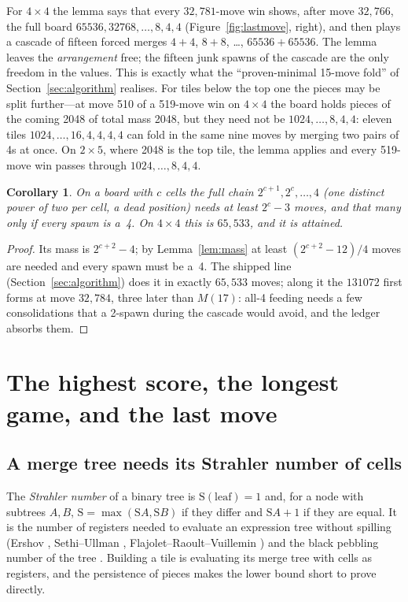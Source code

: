 \documentclass[11pt]{article}
\newtheorem{corollary}[theorem]{Corollary}
\theoremstyle{definition}
\theoremstyle{remark}
\newcommand{\Str}{\mathrm{S}}
\begin{document}
For $4\times4$ the lemma says that every $32{,}781$-move win shows, after
move $32{,}766$, the full board $65536,32768,\dots,8,4,4$
(Figure~\ref{fig:lastmove}, right), and then plays a cascade of fifteen
forced merges $4+4$, $8+8$, \dots, $65536+65536$. The lemma leaves the
\emph{arrangement} free; the fifteen junk spawns of the cascade are the
only freedom in the values. This is exactly what the ``proven-minimal
15-move fold'' of Section~\ref{sec:algorithm} realises. For tiles below
the top one the pieces may be split further---at move 510 of a 519-move
win on $4\times4$ the board holds pieces of the coming 2048 of total mass
2048, but they need not be $1024,\dots,8,4,4$: eleven tiles
$1024,\dots,16,4,4,4,4$ can fold in the same nine moves by merging two
pairs of 4s at once. On $2\times5$, where 2048 is the top tile, the lemma
applies and every 519-move win passes through $1024,\dots,8,4,4$.

\begin{corollary}\label{cor:chain}
On a board with $c$ cells the \emph{full chain} $2^{c+1},2^{c},\dots,4$
(one distinct power of two per cell, a dead position) needs at least
$2^{c}-3$ moves, and that many only if every spawn is a~4. On $4\times4$
this is $65{,}533$, and it is attained.
\end{corollary}
\begin{proof}
Its mass is $2^{c+2}-4$; by Lemma~\ref{lem:mass} at least $(2^{c+2}-12)/4$
moves are needed and every spawn must be a~4. The shipped line
(Section~\ref{sec:algorithm}) does it in exactly $65{,}533$ moves; along
it the $131072$ first forms at move $32{,}784$, three later than $M(17)$:
all-4 feeding needs a few consolidations that a 2-spawn during the cascade
would avoid, and the ledger absorbs them.
\end{proof}

\section{The highest score, the longest game, and the last move}

\subsection{A merge tree needs its Strahler number of cells}

The \emph{Strahler number} of a binary tree is $\Str(\text{leaf})=1$ and,
for a node with subtrees $A,B$, $\Str=\max(\Str A,\Str B)$ if they differ
and $\Str A+1$ if they are equal. It is the number of registers needed to
evaluate an expression tree without spilling (Ershov \cite{ershov1958},
Sethi--Ullman \cite{sethi1970}, Flajolet--Raoult--Vuillemin
\cite{flajolet1979}) and the black pebbling number of the tree
\cite{paterson1970}. Building a tile is evaluating its merge tree with
cells as registers, and the persistence of pieces makes the lower bound
short to prove directly.
\end{document}
